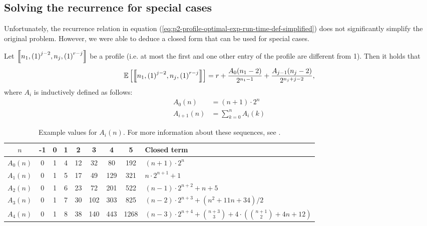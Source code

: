 \subsection{Solving the recurrence for special cases}
\label{sec:p2-profile-exp-runtime-closed-form-spec-cases}

Unfortunately, the recurrence relation in equation (\ref{eq:p2-profile-optimal-exp-run-time-def-simplified}) does not significantly simplify the original problem. However, we were able to deduce a closed form that can be used for special cases.

\begin{theorem}
  \label{theo:simple-profiles-exp-runtime-for-p2-hlf}
  Let $\left\llbracket n_1,{(1)}^{j-2},n_j,{(1)}^{r-j} \right\rrbracket$ be a profile 
  (i.e. at most the first and one other entry of the profile are different from 1).
  Then it holds that
  \begin{equation*}
    \mathbb{E}\left[ \left\llbracket n_1,{(1)}^{j-2},n_j,{(1)}^{r-j} \right\rrbracket \right] = 
    r + \frac{A_0(n_1-2)}{2^{n_1-1}} + \frac{A_{j-1}(n_j-2)}{2^{n_j+j-2}},
  \end{equation*}
  where $A_i$ is inductively defined as follows:
  \begin{align*}
    A_0(n) & = (n+1) \cdot 2^n \\
    A_{i+1}(n) & = \sum_{k=0}^n A_{i}(k)
  \end{align*}
\end{theorem}

\begin{table}
  \centering
  \begin{tabular}[ht]{ccccccccl}
    $n$ & -1 & 0 & 1 & 2 & 3 & 4 & 5 & Closed term \\
    \hline
    $A_0(n)$ & 0 & 1 & 4 & 12 & 32 & 80 & 192 & 
    $(n+1)\cdot 2^{n}$ \\
    $A_1(n)$ & 0 & 1 & 5 & 17 & 49 & 129 & 321 & 
    $n\cdot 2^{n+1} + 1$ \\
    $A_2(n)$ & 0 & 1 & 6 & 23 & 72 & 201& 522 & 
    $(n-1)\cdot 2^{n+2}+n+5$ \\
    $A_3(n)$ & 0 & 1 & 7 & 30 & 102 & 303 & 825 & 
    $(n-2)\cdot 2^{n+3}+(n^2+11 n+34)/2$ \\
    $A_4(n)$ & 0 & 1 & 8 & 38 & 140 & 443 & 1268 &
    $(n-3)\cdot2^{n+4}+\binom{n+3}{3}+4\cdot\left(\binom{n+1}{2}+4 n+12\right)$ \\
  \end{tabular}
  \caption{Example values for $A_i(n)$. For more information about these sequences, see \cite{oeistwoprocsA0}\cite{oeistwoprocsA1,oeistwoprocsA2,oeistwoprocsA3,oeistwoprocsA4}.}
  \label{tab:example-values-an-p2-profile}
\end{table}


